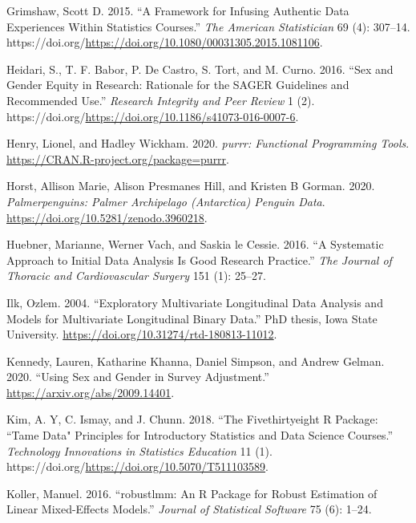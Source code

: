 \documentclass{article}
\newlength{\cslhangindent}
\newlength{\cslentryspacingunit} %
\newenvironment{CSLReferences}[2] %
 {%
  \setlength{\parindent}{0pt}
  \ifodd #1
  \let\oldpar\par
  \def\par{\hangindent=\cslhangindent\oldpar}
  \fi
  \setlength{\parskip}{#2\cslentryspacingunit}
 }%
 {}
\begin{document}
\begin{CSLReferences}{1}{0}
\leavevmode{}%
Grimshaw, Scott D. 2015. {``A Framework for Infusing Authentic Data Experiences Within Statistics Courses.''} \emph{The American Statistician} 69 (4): 307--14. https://doi.org/\url{https://doi.org/10.1080/00031305.2015.1081106}.

\leavevmode{}%
Heidari, S., T. F. Babor, P. De Castro, S. Tort, and M. Curno. 2016. {``Sex and Gender Equity in Research: Rationale for the {SAGER} Guidelines and Recommended Use.''} \emph{Research Integrity and Peer Review} 1 (2). https://doi.org/\url{https://doi.org/10.1186/s41073-016-0007-6}.

\leavevmode{}%
Henry, Lionel, and Hadley Wickham. 2020. \emph{{purrr: Functional Programming Tools}}. \url{https://CRAN.R-project.org/package=purrr}.

\leavevmode{}%
Horst, Allison Marie, Alison Presmanes Hill, and Kristen B Gorman. 2020. \emph{Palmerpenguins: Palmer Archipelago (Antarctica) Penguin Data}. \url{https://doi.org/10.5281/zenodo.3960218}.

\leavevmode{}%
Huebner, Marianne, Werner Vach, and Saskia le Cessie. 2016. {``A Systematic Approach to Initial Data Analysis Is Good Research Practice.''} \emph{The Journal of Thoracic and Cardiovascular Surgery} 151 (1): 25--27.

\leavevmode{}%
Ilk, Ozlem. 2004. {``Exploratory Multivariate Longitudinal Data Analysis and Models for Multivariate Longitudinal Binary Data.''} PhD thesis, Iowa State University. \url{https://doi.org/10.31274/rtd-180813-11012}.

\leavevmode{}%
Kennedy, Lauren, Katharine Khanna, Daniel Simpson, and Andrew Gelman. 2020. {``Using Sex and Gender in Survey Adjustment.''} \url{https://arxiv.org/abs/2009.14401}.

\leavevmode{}%
Kim, A. Y, C. Ismay, and J. Chunn. 2018. {``The Fivethirtyeight {R} Package: ``Tame Data" Principles for Introductory Statistics and Data Science Courses.''} \emph{Technology Innovations in Statistics Education} 11 (1). https://doi.org/\url{https://doi.org/10.5070/T511103589}.

\leavevmode{}%
Koller, Manuel. 2016. {``{robustlmm: An R Package for Robust Estimation of Linear Mixed-Effects Models}.''} \emph{Journal of Statistical Software} 75 (6): 1--24.


\end{CSLReferences}
\end{document}
